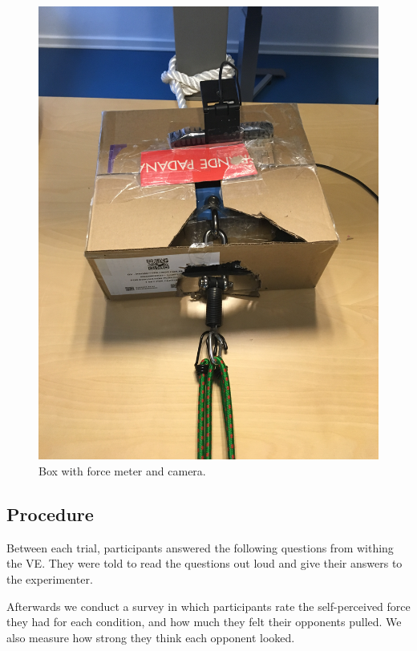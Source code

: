 \begin{figure}[H]
\begin{minipage}[b]{0.4\textwidth}
    \includegraphics[width=\textwidth]{Images/BoxBig.JPG}
    \caption{Box with force meter and camera.}
     \label{fig:setupRopeBox2}
  \end{minipage}
  \hfill
    
\end{figure}



\subsection{Procedure}
Between each trial, participants answered the following questions from withing the VE. They were told to read the questions out loud and give their answers to the experimenter.   

Afterwards we conduct a survey in which participants rate the self-perceived force they had for each condition, and how much they felt their opponents pulled. We also measure how strong they think each opponent looked. 

